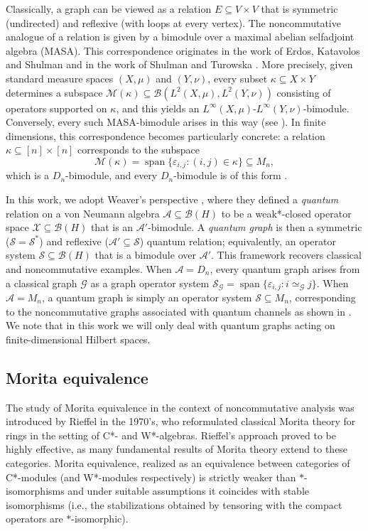 \documentclass[11pt]{amsart}
\numberwithin{equation}{section}
\theoremstyle{plain}
\theoremstyle{definition}
\theoremstyle{remark}
\newcommand{\A}{{\mathcal{A}}}
\newcommand{\B}{{\mathcal{B}}}
\newcommand{\G}{{\mathcal{G}}}
\newcommand{\M}{{\mathcal{M}}}
\renewcommand{\S}{{\mathcal{S}}}
\newcommand{\X}{{\mathcal{X}}}
\begin{document}
Classically, a graph can be viewed as a relation $E \subseteq V \times V$ that is symmetric (undirected) and reflexive (with loops at every vertex). The noncommutative analogue of a relation is given by a bimodule over a maximal abelian selfadjoint algebra (MASA). This correspondence originates in the work of Erd{o}s, Katavolos and Shulman \cite{EKS98} and in the work of Shulman and Turowska \cite{ST04}. More precisely, given standard measure spaces $(X,\mu)$ and $(Y,\nu)$, every subset $\kappa \subseteq X \times Y$ determines a subspace $\M(\kappa) \subseteq \B(L^2(X,\mu), L^2(Y,\nu))$ consisting of operators supported on $\kappa$, and this yields an $L^\infty(X,\mu)$-$L^\infty(Y,\nu)$-bimodule. Conversely, every such MASA-bimodule arises in this way (see \cite[Theorems 4.1 and 4.2]{EKS98}). In finite dimensions, this correspondence becomes particularly concrete: a relation $\kappa \subseteq [n] \times [n]$ corresponds to the subspace
\[
\M(\kappa) = \operatorname{span}\{\varepsilon_{i,j} : (i,j) \in \kappa\} \subseteq M_n,
\]
which is a $D_n$-bimodule, and every $D_n$-bimodule is of this form \cite[Proposition 1.1]{PPS89}.

In this work, we adopt Weaver’s perspective \cite{Wea12, Wea21}, where they defined a \emph{quantum} relation on a von Neumann algebra $\A \subseteq \B(H)$ to be a weak*-closed operator space $\X \subseteq \B(H)$ that is an $\A'$-bimodule. A \emph{quantum graph} is then a symmetric ($\S = \S^*$) and reflexive ($\A' \subseteq \S$) quantum relation; equivalently, an operator system $\S \subseteq \B(H)$ that is a bimodule over $\A'$. This framework recovers classical and noncommutative examples. When $\A= D_n$, every quantum graph arises from a classical graph $\G$ as a graph operator system $\S_{\G} = \operatorname{span}\{\varepsilon_{i,j} : i \simeq_{\G} j\}.$
When $\A = M_n$, a quantum graph is simply an operator system $\S \subseteq M_n$, corresponding to the noncommutative graphs associated with quantum channels as shown in \cite[Lemma~2]{DUAN09}. We note that in this work we will only deal with quantum graphs acting on finite-dimensional Hilbert spaces.

\subsection{Morita equivalence}
The study of Morita equivalence in the context of noncommutative analysis was introduced by Rieffel \cite{Rief74} in the 1970’s, who reformulated classical Morita theory for rings in the setting of C*- and W*-algebras. Rieffel’s approach proved to be highly effective, as many fundamental results of Morita theory \cite{Bass62} extend to these categories. Morita equivalence, realized as an equivalence between categories of C*-modules (and W*-modules respectively) is strictly weaker than $*$-isomorphisms and under suitable assumptions it coincides with stable isomorphisms \cite{BGR77} (i.e., the stabilizations obtained by tensoring with the compact operators are $*$-isomorphic).
\end{document}
